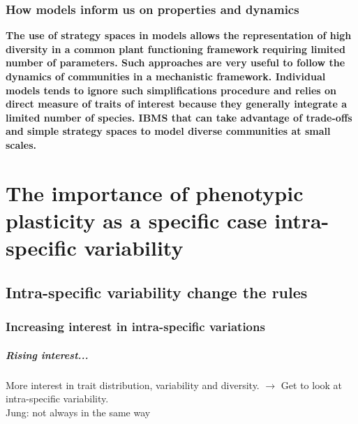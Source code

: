 \subsection{How models inform us on properties and dynamics}

\textbf{The use of strategy spaces in models allows the representation of high diversity in a common plant functioning framework requiring limited number of parameters. Such approaches are very useful to follow the dynamics of communities in a mechanistic framework. Individual models tends to ignore such simplifications procedure and relies on direct measure of traits of interest because they generally integrate a limited number of species. IBMS that can take advantage of trade-offs and simple strategy spaces to model diverse communities at small scales.}


\chapter{The importance of phenotypic plasticity as a specific case intra-specific variability}

\section{Intra-specific variability change the rules}

\subsection{Increasing interest in intra-specific variations}
\paragraph{Rising interest...}
More interest in trait distribution, variability and diversity. $\rightarrow$ Get to look at intra-specific variability.\\
Jung: not always in the same way \parencite{jung_intraspecific_2014}\\

\parencite{poorter_biomass_2012}
\parencite{poorter_leaf_2006}
\parencite{kichenin_contrasting_2013}
\parencite{siefert_global_2015}
\parencite{albert_importance_2012}
\parencite{violle_return_2012}

